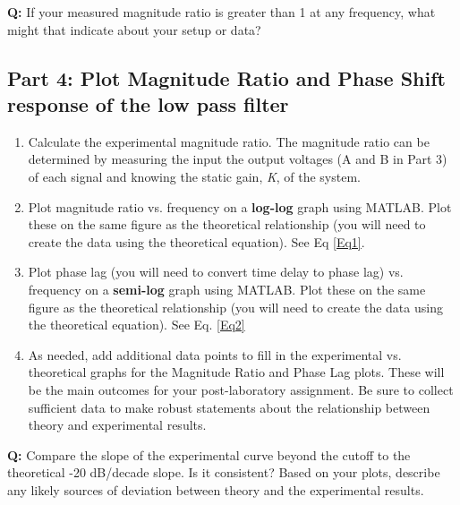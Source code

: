\documentclass{article} %
\begin{document}
\textbf{Q:} If your measured magnitude ratio is greater than 1 at any frequency, what might that indicate about your setup or data?

\subsection{Part 4: Plot Magnitude Ratio and Phase Shift response of the low pass filter}
\begin{enumerate}
  \item Calculate the experimental magnitude ratio. The magnitude ratio can be determined by measuring the input the output voltages (A and B in Part 3) of each signal and knowing the static gain, \textit{K}, of the system.
  \item Plot magnitude ratio vs. frequency on a \textbf{log-log} graph using MATLAB. Plot these on the same figure as the theoretical relationship (you will need to create the data using the theoretical equation). See Eq \ref{Eq1}.
  \item Plot phase lag (you will need to convert time delay to phase lag) vs. frequency on a \textbf{semi-log} graph using MATLAB. Plot these on the same figure as the theoretical relationship (you will need to create the data using the theoretical equation). See Eq. \ref{Eq2}
   \item As needed, add additional data points to fill in the experimental vs. theoretical graphs for the Magnitude Ratio and Phase Lag plots. These will be the main outcomes for your post-laboratory assignment. Be sure to collect sufficient data to make robust statements about the relationship between theory and experimental results.
\end{enumerate}

\textbf{Q:} Compare the slope of the experimental curve beyond the cutoff to the theoretical -20 dB/decade slope. Is it consistent? Based on your plots, describe any likely sources of deviation between theory and the experimental results.
\end{document}
